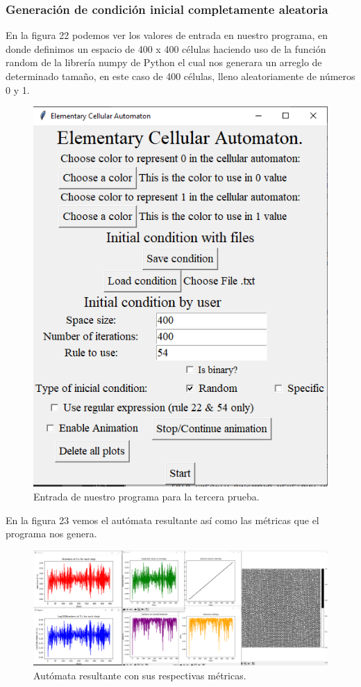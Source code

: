 \documentclass[11pt]{article}
\begin{document}
		\subsubsection{Generación de condición inicial completamente aleatoria}
		En la figura 22 podemos ver los valores de entrada en nuestro programa, en donde definimos un espacio de 400 x 400 células haciendo uso de la función random de la librería numpy de Python el cual nos generara un arreglo de determinado tamaño, en este caso de 400 células, lleno aleatoriamente de números 0 y 1.		
		\begin{figure}[H]
			\centering
			\includegraphics[scale=0.5]{resources/RegEx54/random_entrada.png}
			\caption{Entrada de nuestro programa para la tercera prueba.}\label{fig:picture}
		\end{figure}
		En la figura 23 vemos el autómata resultante así como las métricas que el programa nos genera.
		\begin{figure}[H]
			\includegraphics[scale=0.26]{resources/RegEx54/random_result.png}
			\caption{Autómata resultante con sus respectivas métricas.}\label{fig:picture}
		\end{figure}		
\end{document}
